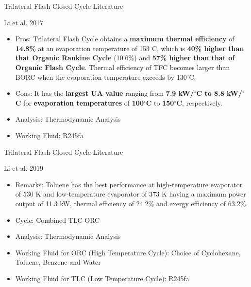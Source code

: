 \begin{frame}{Trilateral Flash Closed Cycle Literature}
    \begin{block}{Li et al. 2017\cite{li2017comparison}}
     \begin{itemize}
         \item Pros: Trilateral Flash Cycle obtains a \textbf{maximum thermal efficiency} of \textbf{14.8\%} at an evaporation temperature of 153$^\circ$C, which is \textbf{40\% higher than that Organic Rankine Cycle} (10.6\%) and \textbf{57\% higher than that of Organic Flash Cycle}. Thermal efficiency of TFC becomes larger than BORC when the evaporation temperature exceeds by 130$^\circ$C.
         \item Cons: It has the \textbf{largest UA value} ranging from \textbf{7.9 kW/$^\circ$C to 8.8 kW/$^\circ$C} for \textbf{evaporation temperatures} of \textbf{100$^\circ$C} to \textbf{150$^\circ$C}, respectively.
         \item Analysis: Thermodynamic Analysis
         \item Working Fluid: R245fa
     \end{itemize}
    \end{block}
\end{frame}

\begin{frame}{Trilateral Flash Closed Cycle Literature}
    \begin{block}{Li et al. 2019\cite{li2019analysis}}
     \begin{itemize}
         \item Remarks: Toluene has the best performance at high-temperature evaporator of 530 K and low-temperature evaporator of 373 K having a maximum power output of 11.3 kW, thermal efficiency of 24.2\% and exergy efficiency of 63.2\%.
         \item Cycle: Combined TLC-ORC
         \item Analysis: Thermodynamic Analysis
         \item Working Fluid for ORC (High Temperature Cycle): Choice of Cyclohexane, Toluene, Benzene and Water
         \item Working Fluid for TLC (Low Temperature Cycle): R245fa
     \end{itemize}
    \end{block}
\end{frame}

